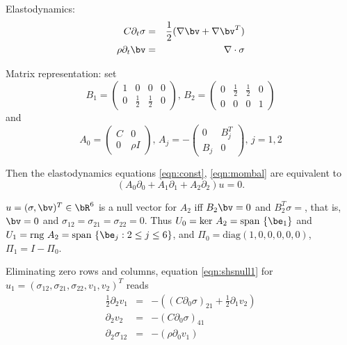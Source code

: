 Elastodynamics:
\begin{eqnarray}
  \label{eqn:const}
  C \partial_ t \sigma & = & \frac{1}{2}(\nabla \bv + \nabla \bv^T) \\
  \label{eqn:mombal}
  \rho \partial_t \bv & = & \nabla \cdot \sigma
\end{eqnarray}

Matrix representation: set
\[
  B_1=\left(
    \begin{array}{cccc}
      1 & 0 & 0 & 0 \\
      0 & \frac{1}{2} & \frac{1}{2} & 0
    \end{array}
  \right),\,
  B_2=\left(
    \begin{array}{cccc}
      0 & \frac{1}{2} & \frac{1}{2} & 0 \\
      0 & 0 & 0 & 1
    \end{array}
  \right)
\]
and
\[
  A_0 = \left(
    \begin{array}{cc}
      C & 0 \\
      0 & \rho I
    \end{array}
  \right), \,
  A_j = -\left(
    \begin{array}{cc}
      0 & B_j^T \\
      B_j & 0
    \end{array}
  \right), \, j=1,2
\]

Then the elastodynamics equations \ref{eqn:const}, \ref{eqn:mombal} are equivalent to
\[
  (A_0\partial_0 + A_1 \partial_1 + A_2 \partial_2)u =0.
\]

$u = (\sigma, \bv)^T \in \bR^6$ is a null vector for $A_2$ iff $B_2\bv = 0$ and $B_2^T \sigma=$, that is, $\bv=0$ and $\sigma_{12}=\sigma_{21}=\sigma_{22} = 0$. Thus $U_0= \mbox{ker }A_2 = \mbox{span } \{\be_1\}$ and  $U_1 = \mbox{rng }A_2 = \mbox{span }\{\be_j: 2\le j \le 6\}$, and $\Pi_0 = \mbox{diag}(1,0,0,0,0,0)$, $\Pi_1 = I-\Pi_0$.

Eliminating zero rows and columns, equation \ref{eqn:shsnull1} for $u_1 = (\sigma_{12}, \sigma_{21}, \sigma_{22}, v_1, v_2)^T$ reads
\begin{eqnarray}
  \frac{1}{2}\partial_2v_1 &=& -((C \partial_0 \sigma)_{21} + \frac{1}{2}\partial_1v_2)\\
  \partial_2 v_2 &=& -(C \partial_0 \sigma)_{41}\\
  \partial_2 \sigma_{12} &=& -(\rho \partial_0v_1)
\end{eqnarray}

